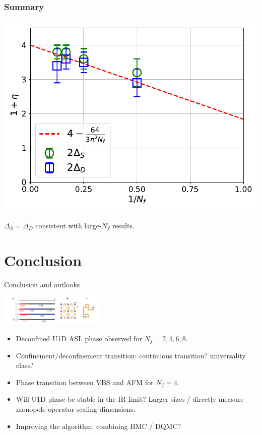 \documentclass[xcolor=table, 10pt, aspectratio=43]{beamer}
\begin{document}
\begin{frame}
  \frametitle{Summary}
  \begin{center}
    \includegraphics[width=.8\textwidth]{eta}
  \end{center}
  $\Delta_S=\Delta_D$ consistent with large-$N_f$ results.
\end{frame}

\section{Conclusion}

\begin{frame}{Conclusion and outlooks}
  \begin{center}
    \includegraphics[width=5cm]{phase-diagram}
  \end{center}
  \begin{itemize}
    \item Deconfined U1D ASL phase observed for $N_f=2,4,6,8$.
    \item Confinement/deconfinement transition: continuous transition? universality class?
    \item Phase transition between VBS and AFM for $N_f=4$.
    \item Will U1D phase be stable in the IR limit? Larger sizes / directly measure monopole-operator scaling dimensions.
    \item Improving the algorithm: combining HMC / DQMC?
  \end{itemize}
\end{frame}
\end{document}
